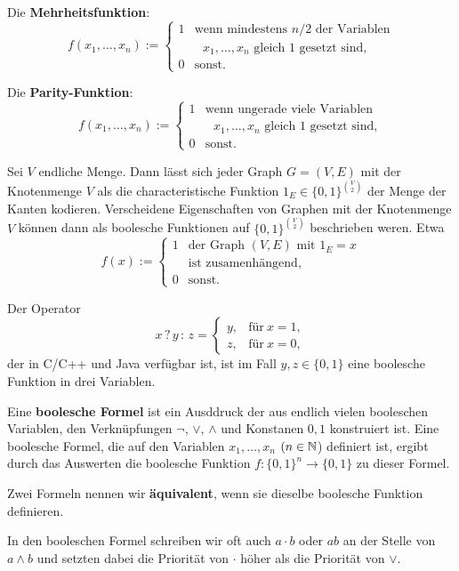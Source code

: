 \begin{bsp}\
	\begin{enuma} 
		\item Die \textbf{Mehrheitsfunktion}:
		\[
		f (x_1,\ldots,x_n) := \begin{cases} 
			1 & \text{wenn mindestens $n/2$ der Variablen}
			\\ & 		\text{ $x_1,\ldots,x_n$ gleich $1$ gesetzt sind}, 
			\\ 0 & \text{sonst}. 
		\end{cases} 
		\]
		\item Die \textbf{Parity-Funktion}: 
		\[
		f (x_1,\ldots,x_n) := \begin{cases} 
			1 & \text{wenn ungerade viele Variablen}
			\\ & 		\text{ $x_1,\ldots,x_n$ gleich $1$ gesetzt sind}, 
			\\ 0 & \text{sonst}. 
		\end{cases} 
		\]
		\item Sei $V$ endliche Menge. Dann lässt sich jeder Graph $G = (V,E)$ mit der Knotenmenge $V$ als die characteristische Funktion $1_E \in \{0,1\}^{\binom{V}{2}}$ der Menge der Kanten kodieren. Verscheidene Eigenschaften von Graphen mit der Knotenmenge $V$ können dann als boolesche Funktionen auf $\{0,1\}^{\binom{V}{2}}$ beschrieben weren. Etwa 
		\[
			f(x) := \begin{cases} 1 & \text{der Graph $(V,E)$ mit $1_E=x$} 
				\\ & \text{ist zusamenhängend}, 
				\\0  & \text{sonst}.
				\end{cases} 
		\]
		\item Der Operator
		\[
			  x \, ?\, y \, :\, z = \begin{cases}
			  			y, & \text{für} \ x =1,
			  			\\ z, & \text{für} \  x=0,
			  	\end{cases} 
		\]
		der in C/C++ und Java verfügbar ist, ist im Fall $y,z \in \{0,1\}$ eine boolesche Funktion in drei Variablen. 
	\end{enuma}
\end{bsp}

\begin{defn}
	Eine \textbf{boolesche Formel} ist ein Ausddruck der aus endlich vielen booleschen Variablen, den Verknüpfungen $\neg$, $\vee$, $\wedge$ und Konstanen $0,1$ konstruiert ist. Eine boolesche Formel, die auf den Variablen  $x_1,\ldots,x_n$ $(n \in \mathbb{N}$) definiert ist, ergibt durch das Auswerten die boolesche Funktion $f : \{0,1\}^n \to \{0,1\}$ zu dieser Formel. 
	
	Zwei Formeln nennen wir \textbf{äquivalent}, wenn sie dieselbe boolesche Funktion definieren. 
	
	In den booleschen Formel schreiben wir oft auch $a \cdot b$ oder $a b$ an der Stelle von $a \wedge b$ und setzten dabei die Priorität von $\cdot$ höher als die Priorität von $\vee$. 
	
\end{defn} 


